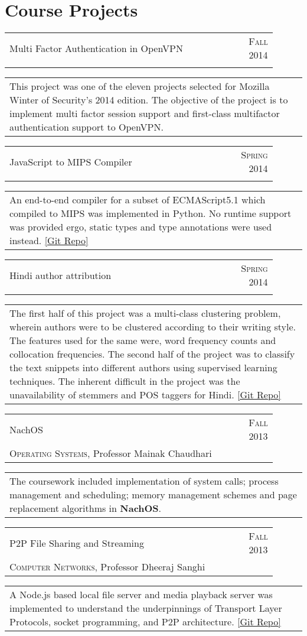 \documentclass[a4paper,10pt]{article} %
\newcommand{\project}[4]{
    \begin{tabular}{p{0.9\linewidth}r}
        \textcolor{NavyBlue}{#2} & \textsc{#1}\\
        #3
    \end{tabular}
    \begin{tabular}{p{\linewidth}}
        \footnotesize{#4}
    \end{tabular}
    \vspace{-0.1cm}
}
\begin{document}
\section{Course Projects}

\project {Fall 2014}
         {Multi Factor Authentication in OpenVPN}
         {\textsc{\raggedright Mozilla Winter of Security}, Guillaume Destuynder and Professor Dheeraj Sanghi}
         {This project was one of the eleven projects selected for Mozilla Winter of Security's 2014 edition.
          The objective of the project is to implement multi factor session
          support and first-class multifactor authentication support to
          OpenVPN.}

\project {Spring 2014}
         {JavaScript to MIPS Compiler}
         {\textsc{\raggedright Compilers}, Professor Subhajit Roy}
         {An end-to-end compiler for a subset of ECMAScript5.1 which compiled to MIPS was implemented in Python.
          No runtime support was provided ergo, static types and type annotations were used instead.
          \href{https://github.com/srijanshetty/javascript-compiler} {[Git Repo]}}

\project {Spring 2014}
         {Hindi author attribution}
         {\textsc{\raggedright Artificial Intelligence}, Professor Amitabha
          Mukherjee}
         {The first half of this project was a multi-class clustering problem,
          wherein authors were to be clustered according to their writing style.
          The features used for the same were, word frequency counts and collocation
          frequencies.  The second half of the project was to classify the text snippets
          into different authors using supervised learning techniques.
          The inherent difficult in the project was the unavailability of stemmers and POS taggers for Hindi.
          \href{https://github.com/srijanshetty/author-attribution} {[Git Repo]}}

\project {Fall 2013}
         {NachOS}
         {\textsc{Operating Systems}, Professor Mainak Chaudhari}
         {The coursework included implementation of system calls; process
          management and scheduling; memory management schemes and page replacement
          algorithms in \textbf{NachOS}.}

\project {Fall 2013}
         {P2P File Sharing and Streaming}
         {\textsc{Computer Networks}, Professor Dheeraj Sanghi}
         {A Node.js based local file server and media playback server was implemented
          to understand the underpinnings of Transport Layer Protocols, socket programming,
          and P2P architecture.  \href{https://github.com/srijanshetty/nodesock} {[Git Repo]}}
\end{document}
